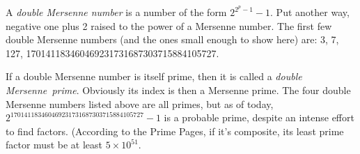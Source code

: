 \documentclass[12pt]{article}
\begin{document}
A {\em double Mersenne number} is a number of the form $2^{2^p - 1} - 1$. Put another way, negative one plus 2 raised to the power of a Mersenne number. The first few double Mersenne numbers (and the ones small enough to show here) are: 3, 7, 127, 170141183460469231731687303715884105727.

If a double Mersenne number is itself prime, then it is called a {\em double Mersenne~prime}. Obviously its index is then a Mersenne prime. The four double Mersenne numbers listed above are all primes, but as of today, $2^{170141183460469231731687303715884105727} - 1$ is a probable prime, despite an intense effort to find factors. (According to the Prime Pages, if it's composite, its least prime factor must be at least $5 \times 10^{51}$.
\end{document}

